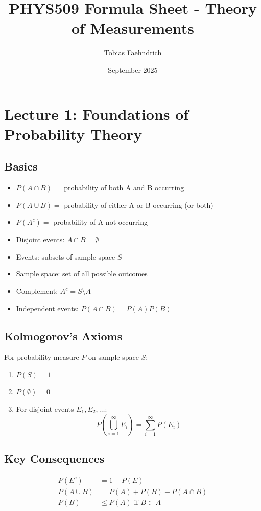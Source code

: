 \documentclass[10pt, twocolumn]{article}
\title{PHYS509 Formula Sheet - Theory of Measurements}
\author{Tobias Faehndrich}
\date{September 2025}
\begin{document}
\maketitle

\section{Lecture 1: Foundations of Probability Theory}

\subsection{Basics}

\begin{itemize}
    \item $P(A \cap B) = $ probability of both A and B occurring
    \item $P(A \cup B) = $ probability of either A or B occurring (or both)
    \item $P(A^c) = $ probability of A not occurring
    \item Disjoint events: $A \cap B = \emptyset$
    \item Events: subsets of sample space $S$
    \item Sample space: set of all possible outcomes
    \item Complement: $A^c = S \setminus A$
    \item Independent events: $P(A \cap B) = P(A)P(B)$
\end{itemize}

\subsection{Kolmogorov's Axioms}
For probability measure $P$ on sample space $S$:
\begin{enumerate}
    \item $P(S) = 1$
    \item $P(\emptyset) = 0$
    \item For disjoint events $E_1, E_2, \ldots$:
          \[ P\left( \bigcup_{i=1}^{\infty} E_i \right) = \sum_{i=1}^{\infty} P(E_i) \]
\end{enumerate}

\subsection{Key Consequences}
\begin{align}
    P(E^c)      & = 1 - P(E)                        \\
    P(A \cup B) & = P(A) + P(B) - P(A \cap B)       \\
    P(B)        & \leq P(A) \text{ if } B \subset A
\end{align}
\end{document}

